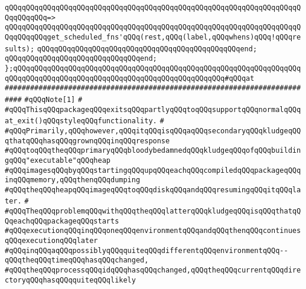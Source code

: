 \verb|qQQqqQQqqQQqqQQqqQQqqQQqqQQqqQQqqQQqqQQqqQQqqQQqqQQqqQQqqQQqqQQqqQQqqQQqqQQqqQQq=>|\newline
\verb|qQQqqQQqqQQqqQQqqQQqqQQqqQQqqQQqqQQqqQQqqQQqqQQqqQQqqQQqqQQqqQQqqQQqqQQqqQQqqQQqget_scheduled_fns'qQQq(rest,qQQq(label,qQQqwhens)qQQq!qQQqresults);|\newline
\verb|qQQqqQQqqQQqqQQqqQQqqQQqqQQqqQQqqQQqqQQqqQQqqQQqend;|\newline
\verb|qQQqqQQqqQQqqQQqqQQqqQQqqQQqqQQqend;|\newline
\newline
\newline
\verb|};qQQqqQQqqQQqqQQqqQQqqQQqqQQqqQQqqQQqqQQqqQQqqQQqqQQqqQQqqQQqqQQqqQQqqQQqqQQqqQQqqQQqqQQqqQQqqQQqqQQqqQQqqQQqqQQqqQQqqQQq#qQQqat|\newline
\newline
\newline
\verb|##########################################################################|\newline
\verb|#qQQqNote[1]|\newline
\verb|#|\newline
\verb|#qQQqThisqQQqpackageqQQqexitsqQQqpartlyqQQqtoqQQqsupportqQQqnormalqQQqat_exit()qQQqstyleqQQqfunctionality.|\newline
\verb|#|\newline
\verb|#qQQqPrimarily,qQQqhowever,qQQqitqQQqisqQQqaqQQqsecondaryqQQqkludgeqQQqthatqQQqhasqQQqgrownqQQqinqQQqresponse|\newline
\verb|#qQQqtoqQQqtheqQQqprimaryqQQqbloodybedamnedqQQqkludgeqQQqofqQQqbuildingqQQq"executable"qQQqheap|\newline
\verb|#qQQqimagesqQQqbyqQQqstartingqQQqupqQQqeachqQQqcompiledqQQqpackageqQQqinqQQqmemory,qQQqthenqQQqdumping|\newline
\verb|#qQQqtheqQQqheapqQQqimageqQQqtoqQQqdiskqQQqandqQQqresumingqQQqitqQQqlater.|\newline
\verb|#|\newline
\verb|#qQQqTheqQQqproblemqQQqwithqQQqtheqQQqlatterqQQqkludgeqQQqisqQQqthatqQQqeachqQQqpackageqQQqstarts|\newline
\verb|#qQQqexecutionqQQqinqQQqoneqQQqenvironmentqQQqandqQQqthenqQQqcontinuesqQQqexecutionqQQqlater|\newline
\verb|#qQQqinqQQqaqQQqpossiblyqQQqquiteqQQqdifferentqQQqenvironmentqQQq--qQQqtheqQQqtimeqQQqhasqQQqchanged,|\newline
\verb|#qQQqtheqQQqprocessqQQqidqQQqhasqQQqchanged,qQQqtheqQQqcurrentqQQqdirectoryqQQqhasqQQqquiteqQQqlikely|\newline
